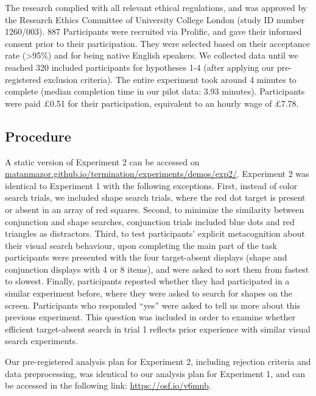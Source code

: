 \documentclass[
  english,
  man]{apa6}
\begin{document}
The research complied with all relevant ethical regulations, and was approved by the Research Ethics Committee of University College London (study ID number 1260/003). 887 Participants were recruited via Prolific, and gave their informed consent prior to their participation. They were selected based on their acceptance rate (\textgreater95\%) and for being native English speakers. We collected data until we reached 320 included participants for hypotheses 1-4 (after applying our pre-registered exclusion criteria). The entire experiment took around 4 minutes to complete (median completion time in our pilot data: 3.93 minutes). Participants were paid £0.51 for their participation, equivalent to an hourly wage of £7.78.

\hypertarget{procedure-1}{%
\subsection{Procedure}\label{procedure-1}}

A static version of Experiment 2 can be accessed on \href{matanmazor.github.io/termination/experiments/demos/exp1/}{matanmazor.github.io/termination/experiments/demos/exp2/}. Experiment 2 was identical to Experiment 1 with the following exceptions. First, instead of color search trials, we included shape search trials, where the red dot target is present or absent in an array of red squares. Second, to minimize the similarity between conjunction and shape searches, conjunction trials included blue dots and red triangles as distractors. Third, to test participants' explicit metacognition about their visual search behaviour, upon completing the main part of the task participants were presented with the four target-absent displays (shape and conjunction displays with 4 or 8 items), and were asked to sort them from fastest to slowest. Finally, participants reported whether they had participated in a similar experiment before, where they were asked to search for shapes on the screen. Participants who responded \enquote{yes} were asked to tell us more about this previous experiment. This question was included in order to examine whether efficient target-absent search in trial 1 reflects prior experience with similar visual search experiments.

Our pre-registered analysis plan for Experiment 2, including rejection criteria and data preprocessing, was identical to our analysis plan for Experiment 1, and can be accessed in the following link: \url{https://osf.io/v6mnb}.
\end{document}
